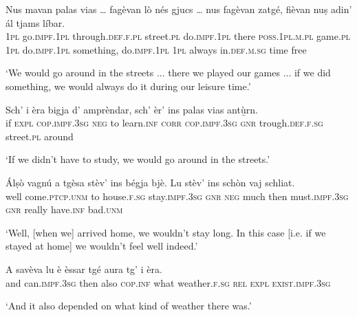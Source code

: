 \begin{linenumbers}
	\gll Nus mavan palas vias … fagèvan lò nés\footnotemark{} gjucs …  nus fagèvan zatgé, fièvan nuṣ adin’ ál tjams líbar.\\
	\textsc{1pl} go.\textsc{impf.1pl} through.\textsc{def.f.pl} street.\textsc{pl} {} do.\textsc{impf.1pl} there \textsc{poss.1pl.m.pl} game.\textsc{pl} {} \textsc{1pl} do.\textsc{impf.1pl} something, do.\textsc{impf.1pl} \textsc{1pl} always in.\textsc{def.m.sg} time free\\
\end{linenumbers}
\medskip
\glt `We would go around in the streets ... there we played our games ... if we did something, we would always do it during our leisure time.'
\medskip

\begin{linenumbers}
	\gll Sch’ i èra bigja d’ amprèndar, sch’ èr’ ins palas vias antù̱rn.   \\
	if \textsc{expl} \textsc{cop.impf.3sg} \textsc{neg} to learn.\textsc{inf} \textsc{corr} \textsc{cop.impf.3sg} \textsc{gnr} trough.\textsc{def.f.sg} street.\textsc{pl} around\\
\end{linenumbers}
\medskip
\glt `If we didn't have to study, we would go around in the streets.'
\medskip

\begin{linenumbers}
	\gll  Álṣò vagnú a tgèsa stèv’ ins bégja bjè. Lu stèv’ ins schòn vaj schliat.  \\
	well come.\textsc{ptcp.unm} to house.\textsc{f.sg} stay.\textsc{impf.3sg} \textsc{gnr} \textsc{neg} much then must.\textsc{impf.3sg} \textsc{gnr} really have.\textsc{inf} bad.\textsc{unm}\\
\end{linenumbers}
\medskip
\glt `Well, [when we] arrived home, we wouldn't stay long. In this case [i.e. if we stayed at home] we wouldn't feel well indeed.'
\medskip

\largerpage
\begin{linenumbers}
	\gll  A savèva lu è èssar tgé aura tg’ i èra.  \\
	and can.\textsc{impf.3sg} then also \textsc{cop.inf} what weather.\textsc{f.sg} \textsc{rel} \textsc{expl} \textsc{exist.impf.3sg}\\
\end{linenumbers}
\medskip
\glt `And it also depended on what kind of weather there was.'
\clearpage

